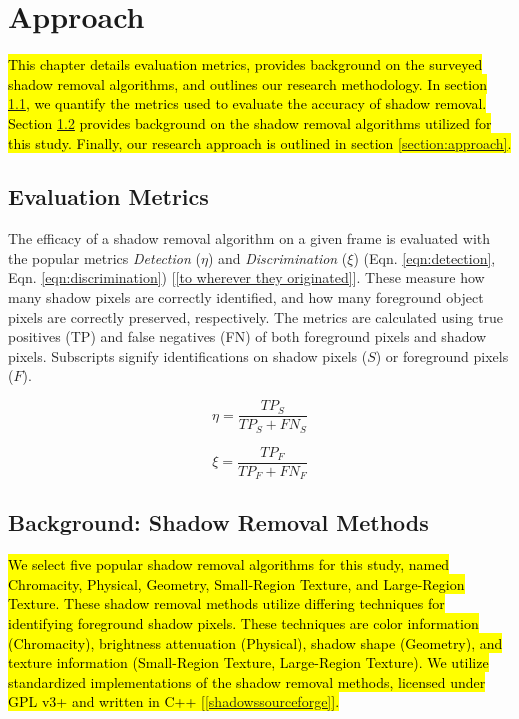 \clearpage
\chapter{Approach}

\hl{This chapter details evaluation metrics, provides background on the surveyed shadow removal algorithms, and outlines our research methodology. In section \ref{section:eval_metrics}, we quantify the metrics used to evaluate the accuracy of shadow removal. Section \ref{section:removalmethods} provides background on the shadow removal algorithms utilized for this study. Finally, our research approach is outlined in section \ref{section:approach}.}

\section{Evaluation Metrics} \label{section:eval_metrics}

The efficacy of a shadow removal algorithm on a given frame is evaluated with the popular metrics \textit{Detection} ($\eta$) and \textit{Discrimination} ($\xi$) (Eqn. \ref{eqn:detection}, Eqn. \ref{eqn:discrimination}) [\ref{to wherever they originated}]. These measure how many shadow pixels are correctly identified, and how many foreground object pixels are correctly preserved, respectively. The metrics are calculated using true positives (TP) and false negatives (FN) of both foreground pixels and shadow pixels. Subscripts signify identifications on shadow pixels ($S$) or foreground pixels ($F$).

\begin{equation}
\eta = \dfrac{TP_{S}}{TP_{S} + FN_{S}} \label{eqn:detection}
\end{equation}

\begin{equation}
\xi = \dfrac{TP_{F}}{TP_{F} + FN_{F}} \label{eqn:discrimination}
\end{equation}

\section{Background: Shadow Removal Methods} \label{section:removalmethods}

\hl{We select five popular shadow removal algorithms for this study, named Chromacity, Physical, Geometry, Small-Region Texture, and Large-Region Texture. These shadow removal methods utilize differing techniques for identifying foreground shadow pixels. These techniques are color information (Chromacity), brightness attenuation (Physical), shadow shape (Geometry), and texture information (Small-Region Texture, Large-Region Texture). We utilize standardized implementations of the shadow removal methods, licensed under GPL v3+ and written in C++ [\ref{shadowssourceforge}].} 

